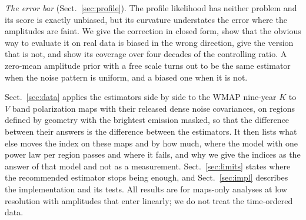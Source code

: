 \emph{The error bar} (Sect.~\ref{sec:profile}). The profile likelihood has neither problem and its
score is exactly unbiased, but its curvature understates the error where the amplitudes are faint.
We give the correction in closed form, show that the obvious way to evaluate it on real data is
biased in the wrong direction, give the version that is not, and show its coverage over four decades
of the controlling ratio. A zero-mean amplitude prior with a free scale turns out to be the same
estimator when the noise pattern is uniform, and a biased one when it is not.

Sect.~\ref{sec:data} applies the estimators side by side to the WMAP nine-year $K$ to $V$ band
polarization maps with their released dense noise covariances, on regions defined by geometry with
the brightest emission masked, so that the difference between their answers is the difference between
the estimators. It then lists what else moves the index on these maps and by how much, where the
model with one power law per region passes and where it fails, and why we give the indices as the
answer of that model and not as a measurement. Sect.~\ref{sec:limits} states where the
recommended estimator stops being enough, and Sect.~\ref{sec:impl} describes the implementation and
its tests. All results are for maps-only analyses at low resolution with amplitudes that enter
linearly; we do not treat the time-ordered data.
